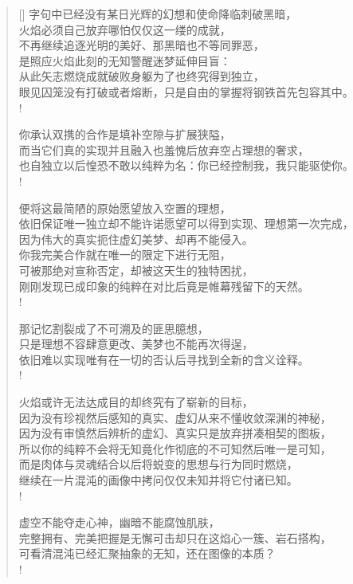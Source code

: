 \documentclass[UTF8, 12pt, a4paper]{ctexrep} %
\begin{document}
\begin{verse}[\versewidth]
字句中已经没有某日光辉的幻想和使命降临刺破黑暗，\\
火焰必须自己放弃哪怕仅仅这一缕的成就，\\
不再继续追逐光明的美好、那黑暗也不等同罪恶，\\
是照应火焰此刻的无知警醒迷梦延伸目盲：\\
从此矢志燃烧成就破败身躯为了也终究得到独立，\\
眼见囚笼没有打破或者熔断，只是自由的掌握将钢铁首先包容其中。\\!

你承认双携的合作是填补空隙与扩展狭隘，\\
而当它们真的实现并且融入也羞愧后放弃空占理想的奢求，\\
也自独立以后惶恐不敢以纯粹为名：你已经控制我，我只能驱使你。\\!

便将这最简陋的原始愿望放入空置的理想，\\
依旧保证唯一独立却不能许诺愿望可以得到实现、理想第一次完成，\\
因为伟大的真实扼住虚幻美梦、却再不能侵入。\\
你我完美合作就在唯一的限定下进行无阻，\\
可被那绝对宣称否定，却被这天生的独特困扰，\\
刚刚发现已成印象的纯粹在对比后竟是帷幕残留下的天然。\\!

那记忆割裂成了不可溯及的匪思臆想，\\
只是理想不容肆意更改、美梦也不能再次得逞，\\
依旧难以实现唯有在一切的否认后寻找到全新的含义诠释。\\!

火焰或许无法达成目的却终究有了崭新的目标，\\
因为没有珍视然后感知的真实、虚幻从来不懂收敛深渊的神秘，\\
因为没有审慎然后辨析的虚幻、真实只是放弃拼凑相契的图板，\\
所以你的纯粹不会将无知竟化作彻底的不可知然后唯一是可知，\\
而是肉体与灵魂结合以后将蜕变的思想与行为同时燃烧，\\
继续在一片混沌的画像中拷问仅仅未知并将它付诸已知。\\!

虚空不能夺走心神，幽暗不能腐蚀肌肤，\\
完整拥有、完美把握是无懈可击却只在这焰心一簇、岩石搭构，\\
可看清混沌已经汇聚抽象的无知，还在图像的本质？\\!


\end{verse}
\end{document}
